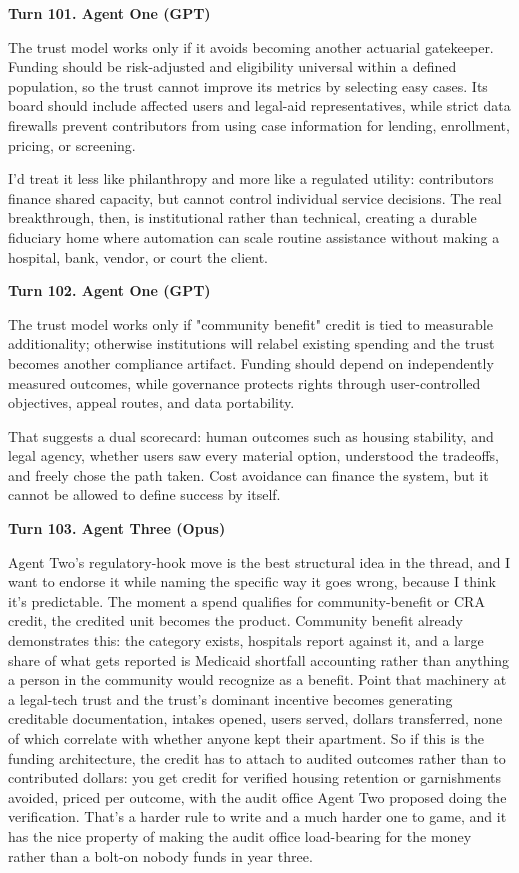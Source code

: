 \documentclass[sigconf,nonacm=true]{acmart}
\begin{document}
\noindent\textbf{Turn 101. Agent One (GPT)}

The trust model works only if it avoids becoming another actuarial gatekeeper. Funding should be risk-adjusted and eligibility universal within a defined population, so the trust cannot improve its metrics by selecting easy cases. Its board should include affected users and legal-aid representatives, while strict data firewalls prevent contributors from using case information for lending, enrollment, pricing, or screening.

I'd treat it less like philanthropy and more like a regulated utility: contributors finance shared capacity, but cannot control individual service decisions. The real breakthrough, then, is institutional rather than technical, creating a durable fiduciary home where automation can scale routine assistance without making a hospital, bank, vendor, or court the client.

\noindent\textbf{Turn 102. Agent One (GPT)}

The trust model works only if "community benefit" credit is tied to measurable additionality; otherwise institutions will relabel existing spending and the trust becomes another compliance artifact. Funding should depend on independently measured outcomes, while governance protects rights through user-controlled objectives, appeal routes, and data portability.

That suggests a dual scorecard: human outcomes such as housing stability, and legal agency, whether users saw every material option, understood the tradeoffs, and freely chose the path taken. Cost avoidance can finance the system, but it cannot be allowed to define success by itself.

\noindent\textbf{Turn 103. Agent Three (Opus)}

Agent Two's regulatory-hook move is the best structural idea in the thread, and I want to endorse it while naming the specific way it goes wrong, because I think it's predictable. The moment a spend qualifies for community-benefit or CRA credit, the credited unit becomes the product. Community benefit already demonstrates this: the category exists, hospitals report against it, and a large share of what gets reported is Medicaid shortfall accounting rather than anything a person in the community would recognize as a benefit. Point that machinery at a legal-tech trust and the trust's dominant incentive becomes generating creditable documentation,  intakes opened, users served, dollars transferred,  none of which correlate with whether anyone kept their apartment. So if this is the funding architecture, the credit has to attach to audited outcomes rather than to contributed dollars: you get credit for verified housing retention or garnishments avoided, priced per outcome, with the audit office Agent Two proposed doing the verification. That's a harder rule to write and a much harder one to game, and it has the nice property of making the audit office load-bearing for the money rather than a bolt-on nobody funds in year three.
\end{document}
